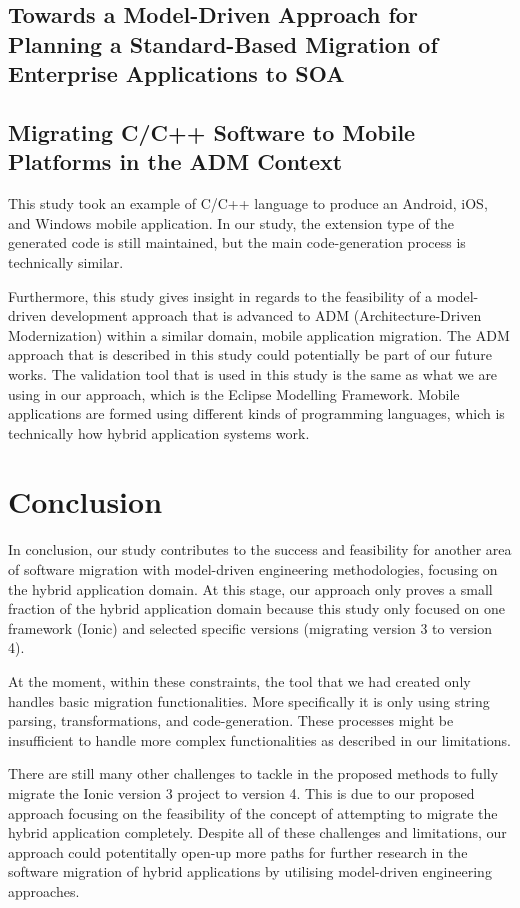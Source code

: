 \documentclass[conference]{IEEEtran}
\begin{document}
\subsection{ Towards a Model-Driven Approach for Planning a Standard-Based Migration of Enterprise Applications to SOA }

\subsection{ Migrating C/C++ Software to Mobile Platforms in the ADM Context }
This study took an example of C/C++ language to produce an Android, iOS, and Windows mobile application. 
In our study, the extension type of the generated code is still maintained,
but the main code-generation process is technically similar. 

Furthermore, this study gives insight in regards to the feasibility of a model-driven development approach that is 
advanced to ADM (Architecture-Driven Modernization) within a similar domain, mobile application migration. 
The ADM approach that is described in this study could potentially be part of our future works. 
The validation tool that is used in this study is the same as what we are using in our approach, which is the Eclipse Modelling Framework.
Mobile applications are formed using different kinds of programming languages, which is technically 
how hybrid application systems work. 

\section{Conclusion}
In conclusion, our study contributes to the success and feasibility for another area 
of software migration with model-driven engineering methodologies, focusing on the hybrid application domain.
At this stage, our approach only proves a small fraction of the hybrid application domain because 
this study only focused on one framework (Ionic) and selected specific versions (migrating version 3 to version 4). 

At the moment, within these constraints, the tool that we had created only handles basic migration functionalities.
More specifically it is only using string parsing, transformations, and code-generation. These processes might
be insufficient to handle more complex functionalities as described in our limitations.

There are still many other challenges to tackle in the proposed methods to fully migrate the Ionic version 3 project
to version 4. This is due to our proposed approach focusing on the feasibility of the concept of attempting to migrate the hybrid application 
completely. Despite all of these challenges and limitations, our approach could potentitally open-up more paths for further research
in the software migration of hybrid applications by utilising model-driven engineering approaches.  
\end{document}
